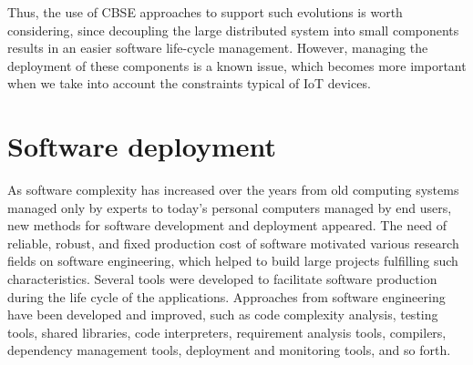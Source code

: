 Thus, the use of CBSE approaches to support such evolutions is worth considering, since decoupling the large distributed system into small components results in an easier software life-cycle management.
However, managing the deployment of these components is a known issue, which becomes more important when we take into account the constraints typical of IoT devices.

\section{Software deployment}
\label{sec:softDeployment}
As software complexity has increased over the years from old computing systems managed only by experts to today's personal computers managed by end users, new methods for software development and deployment appeared.
The need of reliable, robust, and fixed production cost of software motivated various research fields on software engineering, which helped to build large projects fulfilling such characteristics.
Several tools were developed to facilitate software production during the life cycle of the applications.
Approaches from software engineering have been developed and improved, such as code complexity analysis, testing tools, shared libraries, code interpreters, requirement analysis tools, compilers, dependency management tools, deployment and monitoring tools, and so forth.

